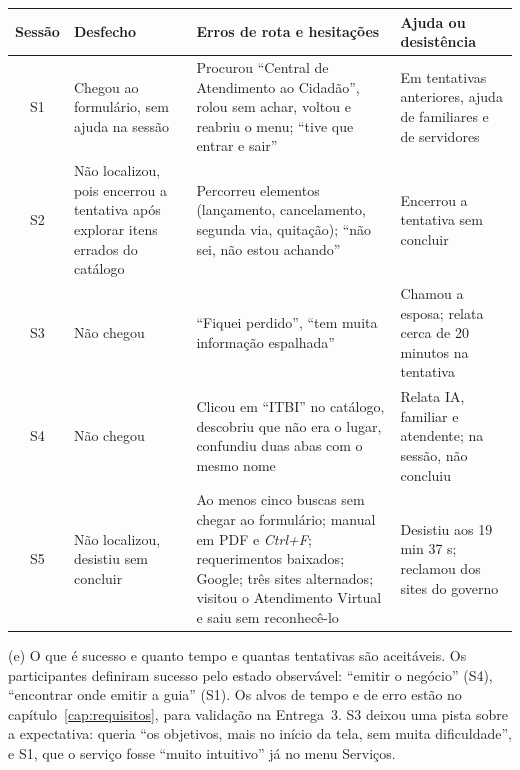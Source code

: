 \documentclass[
  12pt,
  oneside,
  a4paper,
  chapter=TITLE,
  section=TITLE,
  english,
  brazilian
]{abntex2}
\renewcommand{\fonte}[1]{\par\vspace{3pt}{\footnotesize\raggedright\noindent Fonte: #1\par}\vspace{4pt}}%
\renewcommand{\nota}[1]{\par\vspace{2pt}{\footnotesize\raggedright\noindent Nota: #1\par}\vspace{4pt}}%
\begin{document}
\begin{quadro}[!htbp]
  \caption{Resultado de cada sessão}\label{qua:sessoes-res}
  \centering\small
  \begin{tabularx}{\textwidth}{|c|>{\raggedright\arraybackslash}p{2.2cm}|>{\raggedright\arraybackslash}X|>{\raggedright\arraybackslash}X|}\hline
    Sessão & Desfecho & Erros de rota e hesitações & Ajuda ou desistência \\\hline
    S1 & Chegou ao formulário, sem ajuda na sessão & Procurou ``Central de Atendimento ao Cidadão'', rolou sem achar, voltou e reabriu o menu; ``tive que entrar e sair'' & Em tentativas anteriores, ajuda de familiares e de servidores \\\hline
    S2 & Não localizou, pois encerrou a tentativa após explorar itens errados do catálogo & Percorreu elementos (lançamento, cancelamento, segunda via, quitação); ``não sei, não estou achando'' & Encerrou a tentativa sem concluir \\\hline
    S3 & Não chegou & ``Fiquei perdido'', ``tem muita informação espalhada'' & Chamou a esposa; relata cerca de 20 minutos na tentativa \\\hline
    S4 & Não chegou & Clicou em ``ITBI'' no catálogo, descobriu que não era o lugar, confundiu duas abas com o mesmo nome & Relata IA, familiar e atendente; na sessão, não concluiu \\\hline
    S5 & Não localizou, desistiu sem concluir & Ao menos cinco buscas sem chegar ao formulário; manual em PDF e \textit{Ctrl+F}; requerimentos baixados; Google; três sites alternados; visitou o Atendimento Virtual e saiu sem reconhecê-lo & Desistiu aos 19 min 37 s; reclamou dos sites do governo \\\hline
  \end{tabularx}
  \fonte{Elaborado pelos autores com base em S1 a S5 (2026).}
  \nota{Com quatro observações, não se calcula taxa de sucesso com valor inferencial. O quadro descreve o que aconteceu e não estima proporções populacionais.}
\end{quadro}\FloatBarrier

(e) O que é sucesso e quanto tempo e quantas tentativas são aceitáveis.
Os participantes definiram sucesso pelo estado observável: ``emitir o negócio''
(S4), ``encontrar onde emitir a guia'' (S1). Os alvos de tempo e de erro estão no
capítulo~\ref{cap:requisitos}, para validação na Entrega~3. S3 deixou uma pista
sobre a expectativa: queria ``os objetivos, mais no início da tela, sem muita
dificuldade'', e S1, que o serviço fosse ``muito intuitivo'' já no menu Serviços.
\end{document}
